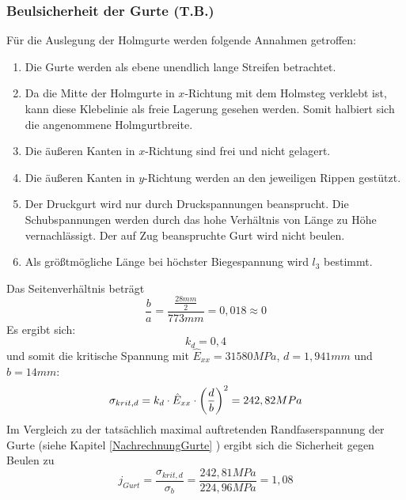 \subsubsection{Beulsicherheit der Gurte (T.B.)}
Für die Auslegung der Holmgurte werden folgende Annahmen getroffen:
\begin{enumerate}
	\item Die Gurte werden als ebene unendlich lange Streifen betrachtet.
	\item Da die Mitte der Holmgurte in $x$-Richtung mit dem Holmsteg verklebt ist, kann diese Klebelinie als freie Lagerung gesehen werden. Somit halbiert sich die angenommene Holmgurtbreite.
	\item Die äußeren Kanten in $x$-Richtung sind frei und nicht gelagert.
	\item Die äußeren Kanten in $y$-Richtung werden an den jeweiligen Rippen gestützt.
	\item Der Druckgurt wird nur durch Druckspannungen beansprucht. Die Schubspannungen werden durch das hohe Verhältnis von Länge zu  Höhe vernachlässigt. Der auf Zug beanspruchte Gurt wird nicht beulen.
	\item Als größtmögliche Länge bei höchster Biegespannung wird $l_{3}$ bestimmt.
\end{enumerate}
Das Seitenverhältnis beträgt 
\begin{equation}
	\frac{b}{a}=\frac{\frac{28 mm}{2}}{773 mm}=0,018 \approx 0
\end{equation}
\noindent Es ergibt sich:
\begin{equation}
	k_{d}=0,4
\end{equation}
und somit die kritische Spannung mit $\hat{E}_{xx}=31580MPa$, $d=1,941mm$ und $b=14mm$:
\begin{equation}
	\sigma_{krit,d}=k_{d}\cdot \hat{E}_{xx}\cdot\biggl(\frac{d}{b}\biggr)^{2}\\
	= 242,82 MPa
\end{equation}
Im Vergleich zu der tatsächlich maximal auftretenden Randfaserspannung der Gurte (siehe Kapitel \ref{NachrechnungGurte} ) ergibt sich die Sicherheit gegen Beulen zu 
\begin{equation}
	j_{Gurt}=\frac{\sigma_{krit,d}}{\sigma_{b}}=\frac{242,81 MPa}{224,96 MPa}=1,08
\end{equation}


